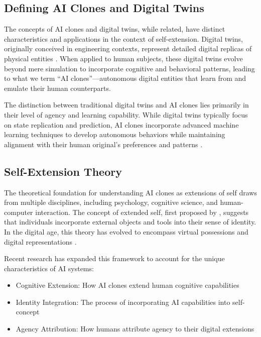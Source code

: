 \subsection{Defining AI Clones and Digital Twins}

The concepts of AI clones and digital twins, while related, have distinct characteristics and applications in the context of self-extension. Digital twins, originally conceived in engineering contexts, represent detailed digital replicas of physical entities \citep{smith2022digital}. When applied to human subjects, these digital twins evolve beyond mere simulation to incorporate cognitive and behavioral patterns, leading to what we term ``AI clones''---autonomous digital entities that learn from and emulate their human counterparts.

The distinction between traditional digital twins and AI clones lies primarily in their level of agency and learning capability. While digital twins typically focus on state replication and prediction, AI clones incorporate advanced machine learning techniques to develop autonomous behaviors while maintaining alignment with their human original's preferences and patterns \citep{lauer2024digital}.

\subsection{Self-Extension Theory}

The theoretical foundation for understanding AI clones as extensions of self draws from multiple disciplines, including psychology, cognitive science, and human-computer interaction. The concept of extended self, first proposed by \citet{belk1988possessions}, suggests that individuals incorporate external objects and tools into their sense of identity. In the digital age, this theory has evolved to encompass virtual possessions and digital representations \citep{kawakami2020digital}.

Recent research has expanded this framework to account for the unique characteristics of AI systems:
\begin{itemize}
\item Cognitive Extension: How AI clones extend human cognitive capabilities
\item Identity Integration: The process of incorporating AI capabilities into self-concept
\item Agency Attribution: How humans attribute agency to their digital extensions
\end{itemize}

